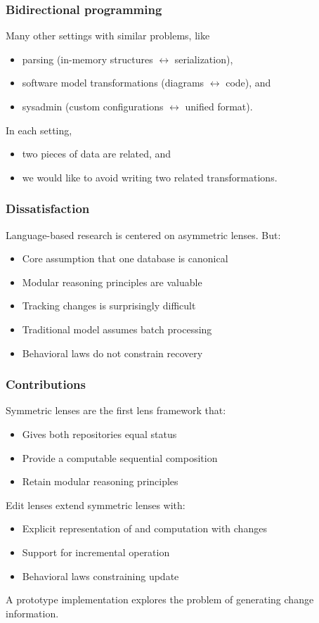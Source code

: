 \documentclass[table]{beamer}
\begin{document}
\begin{frame}
    \frametitle{Bidirectional programming}
    Many other settings with similar problems, like
    \begin{itemize}
        \item parsing (in-memory structures $\leftrightarrow$ serialization),
        \item software model transformations (diagrams $\leftrightarrow$ code), and
        \item sysadmin (custom configurations $\leftrightarrow$ unified format).
    \end{itemize}

    In each setting,
    \begin{itemize}
        \item two pieces of data are related, and
        \item we would like to avoid writing two related transformations.
    \end{itemize}
\end{frame}

\begin{frame}
    \frametitle{Dissatisfaction}
    Language-based research is centered on asymmetric lenses. But:

    \begin{itemize}
        \item Core assumption that one database is canonical
        \item Modular reasoning principles are valuable
        \item Tracking changes is surprisingly difficult
        \item Traditional model assumes batch processing
        \item Behavioral laws do not constrain recovery
    \end{itemize}
\end{frame}

\begin{frame}
    \frametitle{Contributions}
    Symmetric lenses are the first lens framework that:
    \begin{itemize}
        \item Gives both repositories equal status
        \item Provide a computable sequential composition
        \item Retain modular reasoning principles
    \end{itemize}
    Edit lenses extend symmetric lenses with:
    \begin{itemize}
        \item Explicit representation of and computation with changes
        \item Support for incremental operation
        \item Behavioral laws constraining update
    \end{itemize}

    \vpause

    A prototype implementation explores the problem of generating change
    information.
\end{frame}
\end{document}
